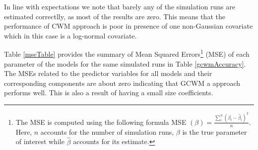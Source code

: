 \documentclass[11pt,letterpaper]{article}
\numberwithin{equation}{section}
\numberwithin{equation}{section}
\numberwithin{equation}{section}
\begin{document}
In line with expectations we note that barely any of the simulation runs are estimated correctlly, as most of the results are zero. This means that the performance of CWM approach is poor in presence of one non-Gaussian covariate which in this case is a log-normal covariate. 

Table \ref{mseTable} provides the summary of Mean Squared Errors\footnote{The MSE is computed using the following formula MSE $(\beta) = \frac{\sum_i^n (\beta_i - \hat\beta_i ) ^2}{n}$. Here, $n$ accounts for the number of simulation runs, $\beta$ is the true parameter of interest while $\hat{\beta}$ accounts for its estimate.} (MSE) of each parameter of the models for the same simulated runs in Table \ref{gcwmAccuracy}. The MSEs related to the predictor variables for all models and their corresponding components are about zero indicating that  GCWM a approach performs well. This is also a result of having a small size coefficients.
\end{document}
